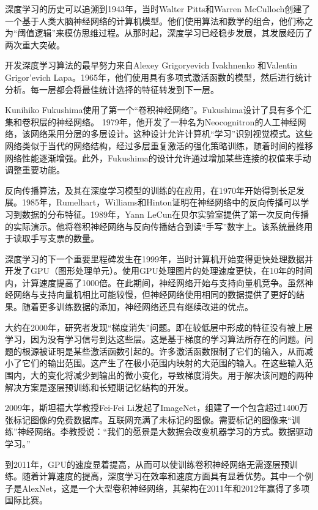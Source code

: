 深度学习的历史可以追溯到1943年，当时Walter Pitts和Warren McCulloch创建了一个基于人类大脑神经网络的计算机模型。他们使用算法和数学的组合，他们称之为“阈值逻辑”来模仿思维过程。从那时起，深度学习已经稳步发展，其发展经历了两次重大突破。

开发深度学习算法的最早努力来自Alexey Grigoryevich Ivakhnenko 和Valentin Grigor'evich Lapa。1965年，他们使用具有多项式激活函数的模型，然后进行统计分析。每一层都会将最佳统计选择的特征转发到下一层。

Kunihiko Fukushima使用了第一个“卷积神经网络”。Fukushima设计了具有多个汇集和卷积层的神经网络。 1979年，他开发了一种名为Neocognitron的人工神经网络，该网络采用分层的多层设计。这种设计允许计算机“学习”识别视觉模式。这些网络类似于当代的网络结构，经过多层重复激活的强化策略训练，随着时间的推移网络性能逐渐增强。此外，Fukushima的设计允许通过增加某些连接的权值来手动调整重要功能。

反向传播算法，及其在深度学习模型的训练的在应用，在1970年开始得到长足发展。1985年，Rumelhart，Williams和Hinton证明在神经网络中的反向传播可以学习到数据的分布特征。1989年，Yann LeCun在贝尔实验室提供了第一次反向传播的实际演示。他将卷积神经网络与反向传播结合到读“手写”数字上。该系统最终用于读取手写支票的数量。

深度学习的下一个重要里程碑发生在1999年，当时计算机开始变得更快处理数据并开发了GPU（图形处理单元）。使用GPU处理图片的处理速度更快，在10年的时间内，计算速度提高了1000倍。在此期间，神经网络开始与支持向量机竞争。虽然神经网络与支持向量机相比可能较慢，但神经网络使用相同的数据提供了更好的结果。随着更多训练数据的添加，神经网络还具有继续改进的优点。

大约在2000年，研究者发现“梯度消失”问题。即在较低层中形成的特征没有被上层学习，因为没有学习信号到达这些层。这是基于梯度的学习算法所存在的问题。问题的根源被证明是某些激活函数引起的。许多激活函数限制了它们的输入，从而减小了它们的输出范围。这产生了在极小范围内映射的大范围的输入。在这些输入范围内，大的变化将减少到输出的微小变化，导致梯度消失。用于解决该问题的两种解决方案是逐层预训练和长短期记忆结构的开发。

2009年，斯坦福大学教授Fei-Fei Li发起了ImageNet，组建了一个包含超过1400万张标记图像的免费数据库。互联网充满了未标记的图像。需要标记的图像来“训练”神经网络。李教授说：“我们的愿景是大数据会改变机器学习的方式。数据驱动学习。”

到2011年，GPU的速度显着提高，从而可以使训练卷积神经网络无需逐层预训练。随着计算速度的提高，深度学习在效率和速度方面具有显着优势。其中一个例子是AlexNet，这是一个大型卷积神经网络，其架构在2011年和2012年赢得了多项国际比赛。

